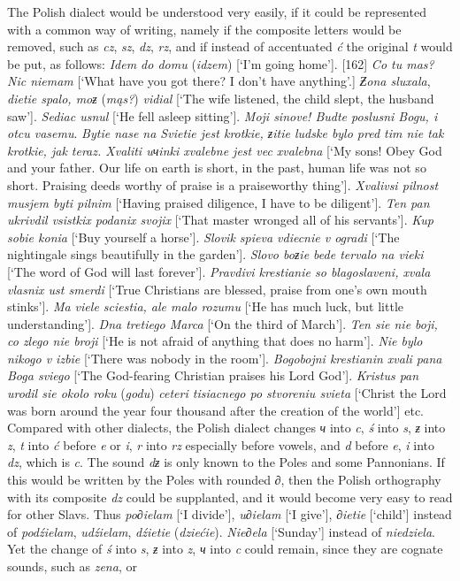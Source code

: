 The Polish dialect would be understood very easily, if it could be represented with a common way of writing, namely if the composite letters would be removed, such as \textit{cz}, \textit{sz}, \textit{dz}, \textit{rz}, and if instead of accentuated \textit{ć} the original \textit{t} would be put, as follows: \textit{Idem do domu} (\textit{idzem}) [‘I’m going home’]. [162] \textit{Co tu mas? Nic niemam} [‘What have you got there? I don’t have anything’.] \textit{Ƶona sluxala}, \textit{dietie spalo, moƶ} (\textit{mąs?}) \textit{vidial} [‘The wife listened, the child slept, the husband saw’]. \textit{Sediac usnul} [‘He fell asleep sitting’]. \textit{Moji sinove! Budte poslusni Bogu, i otcu vasemu}. \textit{Bytie nase na Svietie jest krotkie, ƶitie ludske bylo pred tim nie tak krotkie, jak teraz. Xvaliti uчinki xvalebne jest vec xvalebna} [‘My sons! Obey God and your father. Our life on earth is short, in the past, human life was not so short. Praising deeds worthy of praise is a praiseworthy thing’]. \textit{Xvalivsi pilnost musjem byti pilnim} [‘Having praised diligence, I have to be diligent’]. \textit{Ten pan ukrivdil vsistkix podanix svojix} [‘That master wronged all of his servants’]. \textit{Kup sobie konia} [‘Buy yourself a horse’]. \textit{Slovik spieva vdiecnie v ogradi} [‘The nightingale sings beautifully in the garden’]. \textit{Slovo boƶie bede tervalo na vieki} [‘The word of God will last forever’]. \textit{Pravdivi krestianie so blagoslaveni, xvala vlasnix ust smerdi} [‘True Christians are blessed, praise from one’s own mouth stinks’]. \textit{Ma viele sciestia, ale malo rozumu} [‘He has much luck, but little understanding’]. \textit{Dna tretiego Marca} [‘On the third of March’]. \textit{Ten sie nie boji, co zlego nie broji} [‘He is not afraid of anything that does no harm’]. \textit{Nie bylo nikogo v izbie} [‘There was nobody in the room’]. \textit{Bogobojni krestianin xvali pana Boga sviego} [‘The God-fearing Christian praises his Lord God’]. \textit{Kristus pan urodil sie okolo roku} (\textit{godu}) \textit{ceteri tisiacnego po stvoreniu svieta} [‘Christ the Lord was born around the year four thousand after the creation of the world’] etc. Compared with other dialects, the Polish dialect changes \textit{ч} into \textit{c}, \textit{ś} into \textit{s}, \textit{ƶ} into \textit{z}, \textit{t} into \textit{ć} before \textit{e} or \textit{i}, \textit{r} into \textit{rz} especially before vowels, and \textit{d} before \textit{e}, \textit{i} into \textit{dz}, which is \textit{c}. The sound \textit{dƶ} is only known to the Poles and some Pannonians. If this would be written by the Poles with rounded \textit{∂}, then the Polish orthography with its composite \textit{dz} could be supplanted, and it would become very easy to read for other Slavs. Thus \textit{po∂ielam} [‘I divide’], \textit{u∂ielam} [‘I give’], \textit{∂ietie} [‘child’] instead of \textit{podźielam}, \textit{udźielam}, \textit{dźietie} (\textit{dziećie}). \textit{Nie∂ela} [‘Sunday’] instead of \textit{niedziela}. Yet the change of \textit{ś} into \textit{s}, \textit{ƶ} into \textit{z}, \textit{ч} into \textit{c} could remain, since they are cognate sounds, such as \textit{zena}, or 